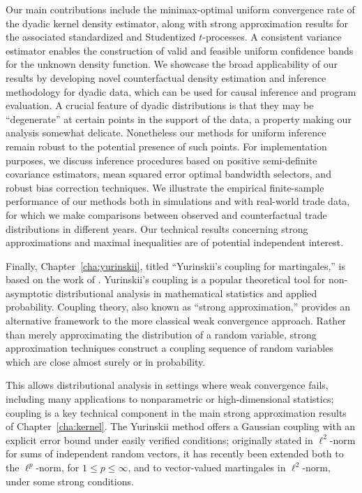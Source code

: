 Our main contributions include the minimax-optimal uniform convergence rate of
the dyadic kernel density estimator, along with strong approximation results
for the associated standardized and Studentized $t$-processes. A consistent
variance estimator enables the construction of valid and feasible uniform
confidence bands for the unknown density function. We showcase the broad
applicability of our results by developing novel counterfactual density
estimation and inference methodology for dyadic data, which can be used for
causal inference and program evaluation.
A crucial feature of dyadic distributions is that they may be ``degenerate'' at
certain points in the support of the data, a property making our analysis
somewhat delicate. Nonetheless our methods for uniform inference remain robust
to the potential presence of such points.
For implementation purposes, we discuss inference procedures based on positive
semi-definite covariance estimators, mean squared error optimal bandwidth
selectors, and robust bias correction techniques. We illustrate the empirical
finite-sample performance of our methods both in simulations and with
real-world trade data, for which we make comparisons between observed and
counterfactual trade distributions in different years. Our technical results
concerning strong approximations and maximal inequalities are of potential
independent interest.

Finally, Chapter~\ref{cha:yurinskii}, titled ``Yurinskii's coupling for
martingales,'' is based on the work of \cite{cattaneo2022yurinskii}.
Yurinskii's coupling is a popular theoretical tool for non-asymptotic
distributional analysis in mathematical statistics and applied probability.
Coupling theory, also known as ``strong approximation,'' provides an
alternative framework to the more classical weak convergence approach. Rather
than merely approximating the distribution of a random variable, strong
approximation techniques construct a coupling sequence of random variables
which are close almost surely or in probability.

This allows distributional analysis in settings where weak convergence fails,
including many applications to nonparametric or high-dimensional statistics;
coupling is a key technical component in the main strong approximation results
of Chapter~\ref{cha:kernel}. The Yurinskii method offers a Gaussian coupling
with an explicit error bound under easily verified conditions; originally
stated in $\ell^2$-norm for sums of independent random vectors, it has recently
been extended both to the $\ell^p$-norm, for $1 \leq p \leq \infty$, and to
vector-valued martingales in $\ell^2$-norm, under some strong conditions.


